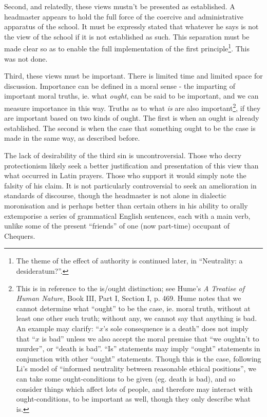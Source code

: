 \documentclass[10pt,a4paper]{article}
\begin{document}
\begin{multicols}{2}
	Second, and relatedly, these views mustn't be presented as established.
	A headmaster appears to hold the full force of the coercive and
	administrative apparatus of the school. It must be expressly stated that
	whatever he says is not the view of the school if it is not established
	as such. This separation must be made clear so as to enable the full
	implementation of the first principle\footnote{The theme of the effect
		of authority is continued later, in ``Neutrality: a desideratum?''.}.
	This was not done.
	
	Third, these views must be important. There is limited time and limited
	space for discussion. Importance can be defined in a moral sense - the
	imparting of important moral truths, ie. what \textit{ought}, can be said
	to be important, and we can measure importance in this way. Truths as to
	what \textit{is} are also important\footnote{This is in reference to the
		is/ought distinction; see Hume's \textit{A Treatise of Human Nature},
		Book III, Part I, Section I, p. 469. Hume notes that we cannot
		determine what ``ought'' to be the case, ie. moral truth, without at
		least one other such truth; without any, we cannot say that anything
		is bad. An example may clarify: ``$x$'s sole consequence is a
		death'' does not imply that ``$x$ is bad'' unless we also accept
		the moral premise that ``we oughtn't to murder'', or ``death is bad''.
		``Is'' statements may imply ``ought'' statements in conjunction with
		other ``ought'' statements. Though this is the case, following Li's
		model of ``informed neutrality between reasonable ethical positions'',
		we can take some ought-conditions to be given (eg. death is bad), and
		so consider things which affect lots of people, and therefore may
		interact with ought-conditions, to be important as well, though they
		only describe what is.}, if they are important based on two kinds of
	ought. The first is when an ought is already established. The second is
	when the case that something ought to be the case is made in the same
	way, as described before.
	
	The lack of desirability of the third sin is uncontroversial. Those who
	decry protectionism likely seek a better justification and presentation
	of this view than what occurred in Latin prayers. Those who support it
	would simply note the falsity of his claim. It is not particularly
	controversial to seek an amelioration in standards of discourse, though
	the headmaster is not alone in dialectic moronisation and is perhaps
	better than certain others in his ability to orally extemporise a series
	of grammatical English sentences, each with a main verb, unlike some of
	the present ``friends'' of one (now part-time) occupant of Chequers.
	

\end{multicols}
\end{document}
